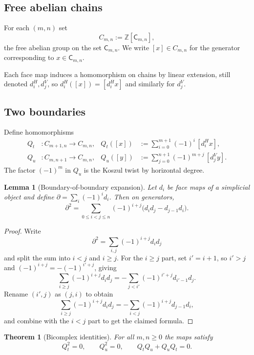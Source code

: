 \documentclass[aps,prl,reprint]{revtex4-2}
\newcommand{\CSK}{\mathsf{C}}
\theoremstyle{definition}
\theoremstyle{plain}
\newtheorem{lemma}{Lemma}[section]
\newtheorem{theorem}{Theorem}[section]
\begin{document}
\subsection{Free abelian chains}
For each $(m,n)$ set
\[C_{m,n}:=\mathbb Z[\CSK_{m,n}],\]
the free abelian group on the set $\CSK_{m,n}$. We write $[x]\in C_{m,n}$ for the
generator corresponding to $x\in\CSK_{m,n}$.

Each face map induces a homomorphism on chains by linear extension, still denoted
$d^H_i,d^V_j$, so $d^H_i([x])=[d^H_i x]$ and similarly for $d^V_j$.

\subsection{Two boundaries}\label{subsec:limited-scope-theorem-translation-clean-004}
Define homomorphisms
\begin{align}
  Q_t &: C_{m+1,n}\to C_{m,n},
  &Q_t([x]) &:= \sum_{i=0}^{m+1} (-1)^i\,[d^H_i x],
  \\
  Q_u &: C_{m,n+1}\to C_{m,n},
  &Q_u([y]) &:= \sum_{j=0}^{n+1} (-1)^{m+j}\,[d^V_j y].
\end{align}
The factor $(-1)^m$ in $Q_u$ is the Koszul twist by horizontal degree.

\begin{lemma}[Boundary-of-boundary expansion]
\label{lem:boundary-boundary}
Let $d_i$ be face maps of a simplicial object and define
$\partial=\sum_i (-1)^i d_i$. Then on generators,
\[
\partial^2
=\sum_{0\le i<j\le n}(-1)^{i+j}\big(d_i d_j - d_{j-1} d_i\big).
\]
\end{lemma}

\begin{proof}
Write
\[
\partial^2=\sum_{i,j}(-1)^{i+j}d_i d_j
\]
and split the sum into $i<j$ and $i\ge j$. For the $i\ge j$ part, set $i'=i+1$,
so $i'>j$ and $(-1)^{i+j}=-(-1)^{i'+j}$, giving
\[
\sum_{i\ge j}(-1)^{i+j}d_i d_j
=-\sum_{j<i'}(-1)^{i'+j}d_{i'-1}d_j.
\]
Rename $(i',j)$ as $(j,i)$ to obtain
\[
\sum_{i\ge j}(-1)^{i+j}d_i d_j
=-\sum_{i<j}(-1)^{i+j}d_{j-1}d_i,
\]
and combine with the $i<j$ part to get the claimed formula.
\end{proof}

\begin{theorem}[Bicomplex identities]
\label{thm:bicomplex}
For all $m,n\ge 0$ the maps satisfy
\[Q_t^2 = 0,\qquad Q_u^2=0,\qquad Q_tQ_u + Q_uQ_t = 0.\]

\end{theorem}
\end{document}
